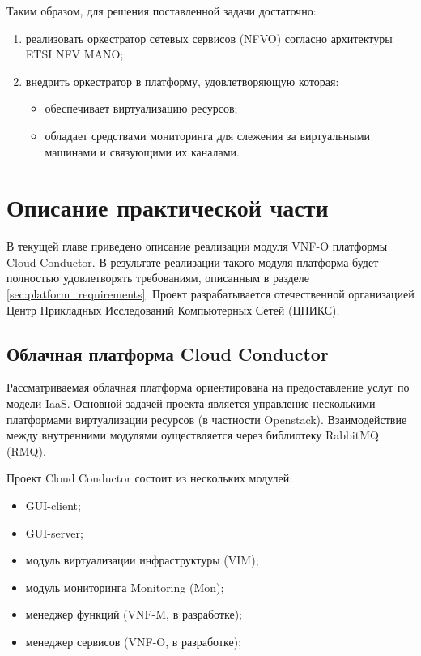 \documentclass[oneside,final,14pt,a4paper]{extreport}
\begin{document}
Таким образом, для решения поставленной задачи достаточно:
\begin{enumerate}
	\item реализовать оркестратор сетевых сервисов (NFVO) согласно архитектуры ETSI NFV MANO;
	\item внедрить оркестратор в платформу, удовлетворяющую которая:
	\begin{itemize}
		\item обеспечивает виртуализацию ресурсов;
		\item обладает средствами мониторинга для слежения за виртуальными машинами и связующими их каналами.
	\end{itemize}
\end{enumerate}





\chapter{Описание практической части}
\label{chap:practice}
В текущей главе приведено описание реализации модуля VNF-O платформы Cloud Conductor. В результате реализации такого модуля платформа будет полностью удовлетворять требованиям, описанным в разделе \ref{sec:platform_requirements}. Проект разрабатывается отечественной организацией Центр Прикладных Исследований Компьютерных Сетей (ЦПИКС).

\section{Облачная платформа Cloud Conductor}
Рассматриваемая облачная платформа ориентирована на предоставление услуг по модели IaaS. Основной задачей проекта является управление несколькими платформами виртуализации ресурсов (в частности Openstack). Взаимодействие между внутренними модулями оуществляется через библиотеку RabbitMQ (RMQ).

Проект Cloud Conductor состоит из нескольких модулей:
\begin{itemize}
	\item GUI-client;
	\item GUI-server;
	\item модуль виртуализации инфраструктуры (VIM);
	\item модуль мониторинга Monitoring (Mon);
	\item менеджер функций (VNF-M, в разработке);
	\item менеджер сервисов (VNF-O, в разработке);
\end{itemize}
\end{document}
